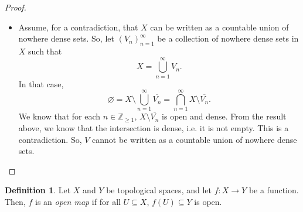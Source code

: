 \documentclass[a4paper, openany]{memoir}
\theoremstyle{definition}
\newtheorem{definition}{Definition}[section]
\theoremstyle{plain}
\begin{document}
\begin{proof}
\begin{itemize}
            \item Assume, for a contradiction, that $X$ can be written as a countable union of nowhere dense sets. So, let $(V_n)_{n=1}^\infty$ be a collection of nowhere dense sets in $X$ such that
            \[X = \bigcup_{n=1}^\infty V_n.\]
            In that case,
            \[\varnothing = X \setminus \bigcup_{n=1}^\infty \overline{V_n} = \bigcap_{n=1}^\infty X \setminus \overline{V_n}.\]
            We know that for each $n \in \mathbb{Z}_{\geq 1}$, $X \setminus \overline{V_n}$ is open and dense. From the result above, we know that the intersection is dense, i.e. it is not empty. This is a contradiction. So, $V$ cannot be written as a countable union of nowhere dense sets.
        \end{itemize}
    \end{proof}

    \begin{definition}
        Let $X$ and $Y$ be topological spaces, and let $f: X \to Y$ be a function. Then, $f$ is an \emph{open map} if for all $U \subseteq X$, $f(U) \subseteq Y$ is open.
    \end{definition}
    
\end{document}
